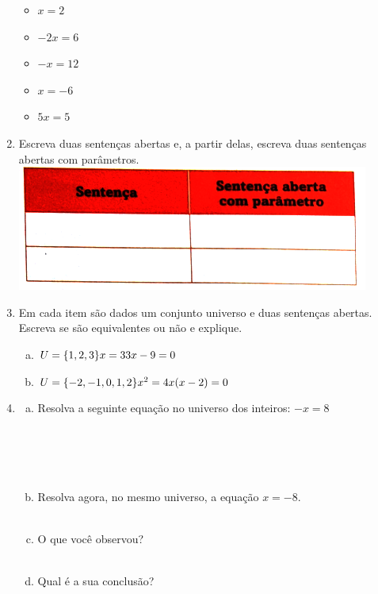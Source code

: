 \documentclass[a4paper,14pt]{article}
\begin{document}
\begin{multicols}{2}
\begin{enumerate}
\begin{itemize}
    	    	\item $x = 2$
    	    	\item $-2x = 6$
    	    	\item $-x = 12$
    	    	\item $x = -6$
    	    	\item $5x = 5$
    	    \end{itemize}
        	\item Escreva duas sentenças abertas e, a partir delas, escreva duas sentenças abertas com parâmetros.
        	\includegraphics[width=1\linewidth]{imagens_6FMA33/tabela2}
        	\item Em cada item são dados um conjunto universo e duas sentenças abertas. Escreva se são equivalentes ou não e explique.
        	\begin{enumerate}[a)]
        		\item $U = \{1, 2, 3\} \\ x = 3 \\ 3x - 9 = 0$
        		\item $U = \{-2, -1, 0, 1, 2\} \\ x^2 = 4 \\ x(x - 2) = 0$
        	\end{enumerate}
        	\item \begin{enumerate}[a)]
        		\item Resolva a seguinte equação no universo dos inteiros: $-x = 8$ \\\\\\\\\\
        		\item Resolva agora, no mesmo universo, a equação $x = -8$. \\\\
        		\item O que você observou? \\\\
        		\item Qual é a sua conclusão? \\\\

\end{enumerate}
\end{enumerate}
\end{multicols}
\end{document}

